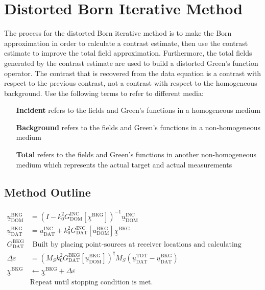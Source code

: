 \documentclass[final,titlepage,onecolumn]{article}
\begin{document}
\FloatBarrier
\section{Distorted Born Iterative Method}
The process for the distorted Born iterative method is to make the Born approximation in order to calculate a contrast estimate, then use the contrast estimate to improve the total field approximation. Furthermore, the total fields generated by the contrast estimate are used to build a distorted Green's function operator. The contrast that is recovered from the data equation is a contrast with respect to the previous contrast, not a contrast with respect to the homogeneous background.
Use the following terms to refer to different media:
\begin{itemize}
	\item[\textbf{Incident}] refers to the fields and Green's functions in a homogeneous medium
	\item[\textbf{Background}] refers to the fields and Green's functions in a non-homogeneous medium
	\item[\textbf{Total}] refers to the fields and Green's functions in another non-homogeneous medium which represents the actual target and actual measurements
\end{itemize}


\FloatBarrier
\subsection{Method Outline}
\begin{align*}
	\underline{u}^{\text{BKG}}_{\text{DOM}} &= \left(I-k_0^2G^{\text{INC}}_{\text{DOM}}\left[\underline{\chi}^{\text{BKG}}\right]\right)^{-1}\underline{u}^{\text{INC}}_{\text{DOM}}\\
	\underline{u}^{\text{BKG}}_{\text{DAT}} &= \underline{u}^{\text{INC}}_{\text{DAT}} + k_0^2G^{\text{INC}}_{\text{DAT}}\left[u^{\text{BKG}}_{\text{DOM}}\right]\underline{\chi}^{\text{BKG}}\\
	G^{\text{BKG}}_{\text{DAT}}	&\text{ Built by placing point-sources at receiver locations and calculating fields.}\\
	\underline{\Delta\varepsilon} &=\left(M_Sk_0^2G^{\text{BKG}}_{\text{DAT}}\left[\underline{u}^{\text{BKG}}_{\text{DOM}}\right]\right)^\dagger M_S\left(\underline{u}^{\text{TOT}}_{\text{DAT}}-\underline{u}^{\text{BKG}}_{\text{DAT}}\right)\\
	\underline{\chi}^{\text{BKG}} & \gets \underline{\chi}^{\text{BKG}} + \underline{\Delta\varepsilon}\\
	&\text{Repeat until stopping condition is met.}
\end{align*}
\end{document}
